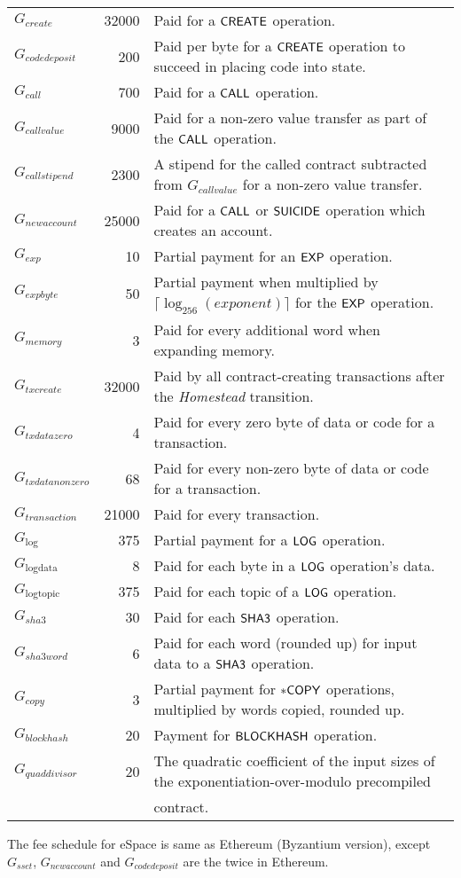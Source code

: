 \begin{center}
\begin{tabu}{l r l}
		$G_{create}$ & 32000 & Paid for a $\mathsf{CREATE}$ operation. \\
		$G_{codedeposit}$ & 200 & Paid per byte for a $\mathsf{CREATE}$ operation to succeed in placing code into state. \\
		$G_{call}$ & 700 & Paid for a $\mathsf{CALL}$ operation. \\
		$G_{callvalue}$ & 9000 & Paid for a non-zero value transfer as part of the $\mathsf{CALL}$ operation. \\
		$G_{callstipend}$ & 2300 & A stipend for the called contract subtracted from $G_{callvalue}$ for a non-zero value transfer. \\
		$G_{newaccount}$ & 25000 & Paid for a $\mathsf{CALL}$ or $\mathsf{SUICIDE}$ operation which creates an account. \\
		$G_{exp}$ & 10 & Partial payment for an $\mathsf{EXP}$ operation. \\
		$G_{expbyte}$ & 50 & Partial payment when multiplied by $\lceil\log_{256}(exponent)\rceil$ for the $\mathsf{EXP}$ operation. \\
		$G_{memory}$ & 3 & Paid for every additional word when expanding memory. \\
		$G_{txcreate}$ & 32000 & Paid by all contract-creating transactions after the {\textit{Homestead} transition}.\\
		$G_{txdatazero}$ & 4 & Paid for every zero byte of data or code for a transaction. \\
		$G_{txdatanonzero}$ & 68 & Paid for every non-zero byte of data or code for a transaction. \\
		$G_{transaction}$ & 21000 & Paid for every transaction. \\
		$G_{\mathrm{log}}$ & 375 & Partial payment for a $\mathsf{LOG}$ operation. \\
		$G_{\mathrm{logdata}}$ & 8 & Paid for each byte in a $\mathsf{LOG}$ operation's data. \\
		$G_{\mathrm{logtopic}}$ & 375 & Paid for each topic of a $\mathsf{LOG}$ operation. \\
		$G_{sha3}$ & 30 & Paid for each $\mathsf{SHA3}$ operation. \\
		$G_{sha3word}$ & 6 & Paid for each word (rounded up) for input data to a $\mathsf{SHA3}$ operation. \\
		$G_{copy}$ & 3 & Partial payment for $\mathsf{*COPY}$ operations, multiplied by words copied, rounded up. \\
		$G_{blockhash}$ & 20 & Payment for $\mathsf{BLOCKHASH}$ operation. \\
		$G_{quaddivisor}$ & 20 & The quadratic coefficient of the input sizes of the exponentiation-over-modulo precompiled\\
		&&contract. \\
		\bottomrule
	\end{tabu}
\end{center}

The fee schedule for eSpace is same as Ethereum (Byzantium version), except $G_{sset}$, $G_{newaccount}$ and $G_{codedeposit}$ are the twice in Ethereum. 